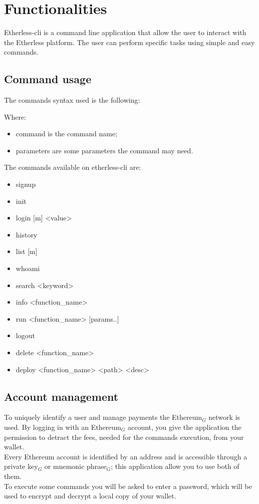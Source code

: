 \section{Functionalities}
Etherless-cli is a command line application that allow the user to interact with the Etherless platform. The user can perform specific tasks using simple and easy commands.

\subsection{Command usage}
The commands syntax used is the following:
\begin{center}
\end{center}
Where:
\begin{itemize}
	\item command is the command name;
	\item parameters are some parameters the command may need.
\end{itemize}

\noindent The commands available on etherless-cli are:
\begin{itemize}
	\item signup
	\item init
	\item login [m] <value>
	\item history
	\item list [m]
	\item whoami
	\item search <keyword>
	\item info <function\_name>
	\item run <function\_name> [params..]
	\item logout
	\item delete <function\_name>
	\item deploy <function\_name> <path> <desc>
\end{itemize}

\subsection{Account management}
To uniquely identify a user and manage payments the Ethereum$_{G}$ network is used. By logging in with an Ethereum$_{G}$ account, you give the application the permission to detract the fees, needed for the commands execution, from your wallet. \\
Every Ethereum account is identified by an address and is accessible through a private key$_{G}$ or mnemonic phrase$_{G}$; this application allow you to use both of them. \\
To execute some commands you will be asked to enter a password, which will be used to encrypt and decrypt a local copy of your wallet.

